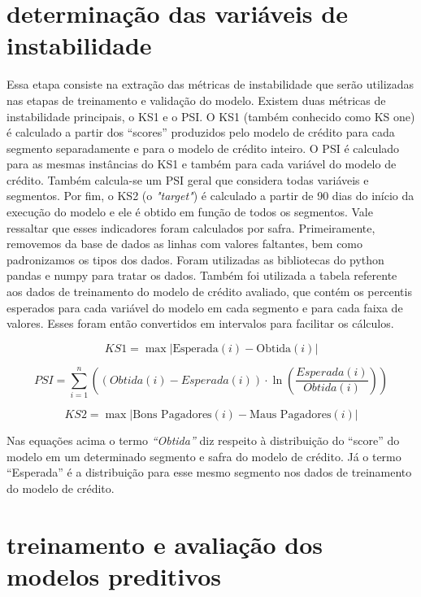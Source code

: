 \section{determinação das variáveis de instabilidade}

 Essa etapa consiste na extração das métricas de instabilidade que serão utilizadas nas etapas de  treinamento e validação do modelo. Existem duas métricas de instabilidade principais, o KS1 e o PSI. O KS1 (também conhecido como KS one)  é calculado a partir dos “scores” produzidos pelo modelo de crédito para cada segmento separadamente e para o modelo de crédito inteiro. O PSI é calculado para as mesmas instâncias do KS1 e também para cada variável do modelo de crédito. Também calcula-se um PSI geral que considera todas variáveis e segmentos. Por fim, o KS2 (o \emph{"target"}) é calculado a partir de 90 dias do início da execução do modelo e ele é obtido em função de todos os segmentos. Vale ressaltar que esses indicadores foram calculados por safra.
	Primeiramente, removemos da base de dados as linhas com valores faltantes, bem como padronizamos os tipos dos dados. Foram utilizadas as bibliotecas do python pandas e numpy para tratar os dados. Também foi utilizada a tabela referente aos dados de treinamento do modelo de crédito avaliado, que contém os percentis esperados para cada variável do modelo em cada segmento e para cada faixa de valores. Esses foram então convertidos em intervalos para facilitar os cálculos.

\begin{equation}
KS1 = \max \left| \text{Esperada}(i) - \text{Obtida}(i) \right|
\end{equation}
    
\begin{equation}
PSI = \sum_{i=1}^{n} \left( (Obtida(i) - Esperada(i) ) \cdot \ln\left(\frac{{Esperada(i)}}{{Obtida(i)}}\right) \right)
\end{equation}

\begin{equation}
    KS2 = \max {\left| \text{Bons Pagadores}(i) - \text{Maus Pagadores}(i) \right| }
\end{equation}

Nas equações acima o termo \emph{“Obtida”} diz respeito à distribuição do “score” do modelo em um determinado segmento e safra do modelo de crédito. Já o termo “Esperada” é a distribuição para esse mesmo segmento nos dados de treinamento do modelo de crédito.
\section{treinamento e avaliação dos modelos preditivos}

